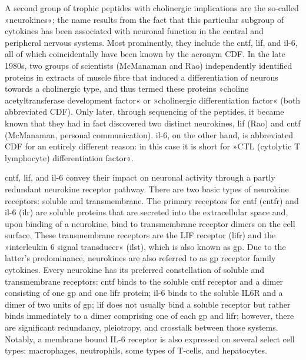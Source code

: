 A second group of trophic peptides with cholinergic implications are the so-called »neurokines«; the name results from the fact that this particular subgroup of cytokines has been associated with neuronal function in the central and peripheral nervous systems. Most prominently, they include the \ac{cntf}, \ac{lif}, and \ac{il}-6, all of which coincidentally have been known by the acronym CDF. In the late 1980s, two groups of scientists (McManaman\cite{McManaman1988} and Rao\cite{Rao1992}) independently identified proteins in extracts of muscle fibre that induced a differentiation of neurons towards a cholinergic type, and thus termed these proteins »choline acetyltransferase development factor« or »cholinergic differentiation factor« (both abbreviated CDF). Only later, through sequencing of the peptides, it became known that they had in fact discovered two distinct neurokines, \ac{lif} (Rao) and \ac{cntf} (McManaman, personal communication). \ac{il}-6, on the other hand, is abbreviated CDF for an entirely different reason: in this case it is short for »CTL (cytolytic T lymphocyte) differentiation factor«.

\ac{cntf}, \ac{lif}, and \ac{il}-6 convey their impact on neuronal activity through a partly redundant neurokine receptor pathway.\cite{Berger2014} There are two basic types of neurokine receptors: soluble and transmembrane. The primary receptors for \ac{cntf} (\acs{cntfr}) and \ac{il}-6 (\acs{ilr}) are soluble proteins that are secreted into the extracellular space and, upon binding of a neurokine, bind to transmembrane receptor dimers on the cell surface. These transmembrane receptors are the LIF receptor (\acs{lifr}) and the »interleukin 6 signal transducer« (\acs{ilst}), which is also known as \acs{gp}. Due to the latter's predominance, neurokines are also referred to as \ac{gp} receptor family cytokines\cite{White2011}. Every neurokine has its preferred constellation of soluble and transmembrane receptors: \ac{cntf} binds to the soluble \ac{cntf} receptor and a dimer consisting of one \ac{gp} and one \ac{lifr} protein; \ac{il}-6 binds to the soluble IL6R and a dimer of two units of \ac{gp}; \ac{lif} does not usually bind a soluble receptor but rather binds immediately to a dimer comprising one of each \ac{gp} and \ac{lifr}; however, there are significant redundancy, pleiotropy, and crosstalk between those systems.\cite{Rawlings2004, White2011, Nathanson2012} Notably, a membrane bound IL-6 receptor is also expressed on several select cell types: macrophages, neutrophils, some types of T-cells, and hepatocytes.\cite{Scheller2011}

